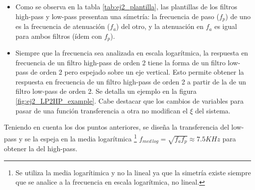 \begin{itemize}	%

	\item Como se observa en la tabla \ref{tab:ej2_plantilla}, las plantillas de los filtros high-pass y low-pass presentan una s\'imetr\'ia: la frecuencia de paso ($f_p$) de uno es la frecuencia de atenuaci\'on ($f_a$) del otro, y la atenuaci\'on en $f_a$ es igual para ambos filtros (\'idem con $f_p$). 
	
	\item Siempre que la frecuencia sea analizada en escala logar\'itmica, la respuesta en frecuencia de un filtro high-pass de orden 2 tiene la forma de un filtro low-pass de orden 2 pero espejado sobre un eje vertical. Esto permite obtener la respuesta en frecuencia de un filtro high-pass de orden 2 a partir de la de un filtro low-pass de orden 2. Se detalla un ejemplo en la figura \ref{fig:ej2_LP2HP_example}. Cabe destacar que los cambios de variables para pasar de una funci\'on transferencia a otra no modifican el $\xi$ del sistema.

\end{itemize}

Teniendo en cuenta los dos puntos anteriores, se dise\~na la transferencia del low-pass y se la espeja en la media logar\'itmica 
\footnote{Se utiliza la media logar\'itimica y no la lineal ya que la simetr\'ia existe siempre que se analice a la frecuencia en escala logar\'itmica, no lineal.} 
$f_{med\, log}  = \sqrt{f_a f_p} \approx 7.5KHz$ para obtener la del high-pass.


